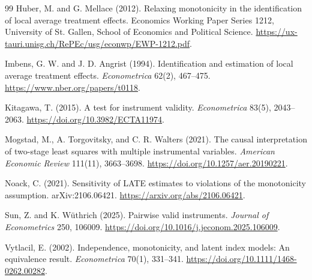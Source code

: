 \documentclass[11pt]{article}
\theoremstyle{definition}
\theoremstyle{plain}
\theoremstyle{remark}
\begin{document}
\begin{thebibliography}{99}
Huber, M. and G. Mellace (2012).
\newblock Relaxing monotonicity in the identification of local average treatment effects.
\newblock Economics Working Paper Series 1212, University of St. Gallen, School of Economics and Political Science.
\newblock \url{https://ux-tauri.unisg.ch/RePEc/usg/econwp/EWP-1212.pdf}.

Imbens, G. W. and J. D. Angrist (1994).
\newblock Identification and estimation of local average treatment effects.
\newblock \emph{Econometrica} 62(2), 467--475.
\newblock \url{https://www.nber.org/papers/t0118}.

Kitagawa, T. (2015).
\newblock A test for instrument validity.
\newblock \emph{Econometrica} 83(5), 2043--2063.
\newblock \url{https://doi.org/10.3982/ECTA11974}.

Mogstad, M., A. Torgovitsky, and C. R. Walters (2021).
\newblock The causal interpretation of two-stage least squares with multiple instrumental variables.
\newblock \emph{American Economic Review} 111(11), 3663--3698.
\newblock \url{https://doi.org/10.1257/aer.20190221}.

Noack, C. (2021).
\newblock Sensitivity of LATE estimates to violations of the monotonicity assumption.
\newblock arXiv:2106.06421.
\newblock \url{https://arxiv.org/abs/2106.06421}.

Sun, Z. and K. W\"uthrich (2025).
\newblock Pairwise valid instruments.
\newblock \emph{Journal of Econometrics} 250, 106009.
\newblock \url{https://doi.org/10.1016/j.jeconom.2025.106009}.

Vytlacil, E. (2002).
\newblock Independence, monotonicity, and latent index models: An equivalence result.
\newblock \emph{Econometrica} 70(1), 331--341.
\newblock \url{https://doi.org/10.1111/1468-0262.00282}.
\end{thebibliography}
\end{document}

